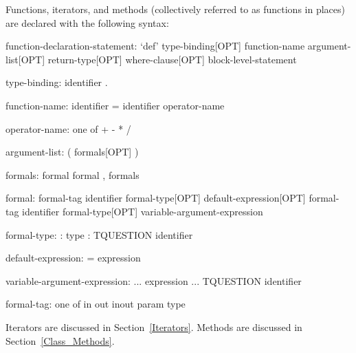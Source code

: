 Functions, iterators, and methods (collectively referred to as
functions in places) are declared with the following syntax:
\begin{syntax}
function-declaration-statement:
  `def' type-binding[OPT] function-name argument-list[OPT]
    return-type[OPT] where-clause[OPT] block-level-statement

type-binding:
  identifier .

function-name:
  identifier
  = identifier
  operator-name

operator-name: one of
  + - * / %

argument-list:
  ( formals[OPT] )

formals:
  formal
  formal , formals

formal:
  formal-tag identifier formal-type[OPT] default-expression[OPT]
  formal-tag identifier formal-type[OPT] variable-argument-expression

formal-type:
  : type
  : TQUESTION identifier

default-expression:
  = expression

variable-argument-expression:
  ... expression
  ... TQUESTION identifier

formal-tag: one of
  in out inout param type
\end{syntax}
Iterators are discussed in Section~\ref{Iterators}.  Methods are
discussed in Section~\ref{Class_Methods}.
